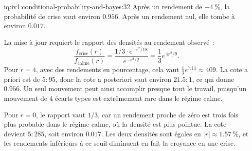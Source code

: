 \begin{solution}{iq:iv1:conditional-probability-and-bayes:32}
Après un rendement de $-4~\%$, la probabilité de crise vaut environ $0.956$. Après un rendement nul, elle tombe à environ $0.017$.

La mise à jour requiert le rapport des densités au rendement observé~:
\[
\frac{f_{\text{crise}}(r)}{f_{\text{calme}}(r)} = \frac{1/3 \cdot e^{-r^2/18}}{e^{-r^2/2}} = \frac13 e^{\,4r^2/9}.
\]
Pour $r = 4$, avec des rendements en pourcentage, cela vaut $\tfrac13 e^{7.11} \approx 409$. La cote a priori est de $5 : 95$, donc la cote a posteriori vaut environ $21.5 : 1$, ce qui donne $0.956$. Un seul mouvement peut ainsi accomplir presque tout le travail, puisqu'un mouvement de 4 écarts types est extrêmement rare dans le régime calme.

Pour $r = 0$, le rapport vaut $1/3$, car un rendement proche de zéro est trois fois plus probable dans le régime calme, où la densité est plus pointue. La cote devient $5 : 285$, soit environ $0.017$. Les deux densités sont égales en $|r| \approx 1.57~\%$, et les rendements inférieurs à ce seuil diminuent en fait la croyance en une crise.

\end{solution}

